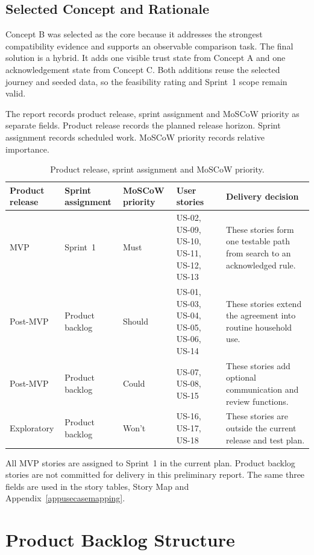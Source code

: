 \documentclass[11pt,a4paper]{article}
\begin{document}
\subsection{Selected Concept and Rationale}

Concept B was selected as the core because it addresses the strongest compatibility evidence and supports an observable comparison task. The final solution is a hybrid. It adds one visible trust state from Concept A and one acknowledgement state from Concept C. Both additions reuse the selected journey and seeded data, so the feasibility rating and Sprint~1 scope remain valid.

The report records product release, sprint assignment and MoSCoW priority as separate fields. Product release records the planned release horizon. Sprint assignment records scheduled work. MoSCoW priority records relative importance.

\begin{table}[H]
    \centering
    \small
    \caption{Product release, sprint assignment and MoSCoW priority.}
    \begin{tabularx}{\textwidth}{@{}L{2.0cm}L{2.3cm}L{1.9cm}L{3.4cm}Y@{}}
        \toprule
        Product release & Sprint assignment & MoSCoW priority & User stories & Delivery decision\\
        \midrule
        MVP & Sprint~1 & Must & US-02, US-09, US-10, US-11, US-12, US-13 & These stories form one testable path from search to an acknowledged rule.\\
        Post-MVP & Product backlog & Should & US-01, US-03, US-04, US-05, US-06, US-14 & These stories extend the agreement into routine household use.\\
        Post-MVP & Product backlog & Could & US-07, US-08, US-15 & These stories add optional communication and review functions.\\
        Exploratory & Product backlog & Won't & US-16, US-17, US-18 & These stories are outside the current release and test plan.\\
        \bottomrule
    \end{tabularx}
    \label{tabmoscow}
\end{table}

All MVP stories are assigned to Sprint~1 in the current plan. Product backlog stories are not committed for delivery in this preliminary report. The same three fields are used in the story tables, Story Map and Appendix~\ref{appusecasemapping}.

\section{Product Backlog Structure}
\label{secbacklog}
\end{document}
